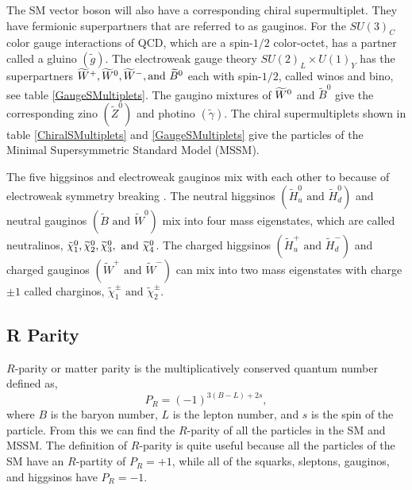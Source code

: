 The SM vector boson will also have a corresponding chiral supermultiplet. They have fermionic superpartners that are referred to as gauginos. For the $SU(3)_C$ color gauge interactions of QCD, which are a spin-$1/2$ color-octet, has a partner called a gluino $(\widetilde{g})$. The electroweak gauge theory $SU(2)_L\times U(1)_Y$ has the superpartners $\widetilde{W}^+,\widetilde{W}^0, \widetilde{W}^-, \text{and } \widetilde{B}^0$ each with spin-$1/2$, called winos and bino, see table \ref{GaugeSMultiplets}. The gaugino mixtures of $\widetilde{W}^0$ and $\widetilde{B}^0$ give the corresponding zino $(\widetilde{Z}^0)$ and photino $(\widetilde{\gamma})$. The chiral supermultiplets shown in table \ref{ChiralSMultiplets} and \ref{GaugeSMultiplets} give the particles of the Minimal Supersymmetric Standard Model (MSSM). 

The five higgsinos and electroweak gauginos mix with each other to because of electroweak symmetry breaking \cite{martin_supersymmetry_1997}. The neutral higgsinos $(\widetilde{H}_u^0 \text{ and } \widetilde{H}_d^0)$ and neutral gauginos $(\widetilde{B} \text{ and } \widetilde{W}^0)$ mix into four mass eigenstates, which are called neutralinos, $\tilde{\chi}^{0}_{1}, \widetilde{\chi}^0_2, \widetilde{\chi}^0_3, \text{ and }\widetilde{\chi}^0_4$. The charged higgsinos $(\widetilde{H}_u^+ \text{ and } \widetilde{H}_d^-)$ and charged gauginos $(\widetilde{W}^+\text{ and } \widetilde{W}^-)$ can mix into two mass eigenstates with charge $\pm1$ called charginos,  $\widetilde{\chi}^\pm_1 \text{ and } \widetilde{\chi}^\pm_2$. 

\subsection{R Parity}
\label{subsec:rparity}

$R$-parity or matter parity is the multiplicatively conserved quantum number defined as, 
\begin{equation} \label{RParity}
P_R=(-1)^{3(B-L)+2s}, 
\end{equation}
where $B$ is the baryon number, $L$ is the lepton number, and $s$ is the spin of the particle. From this we can find the $R$-parity of all the particles in the SM and MSSM. The definition of $R$-parity is quite useful because all the particles of the SM have an $R$-partity of $P_R=+1$, while all of the squarks, sleptons, gauginos, and higgsinos have $P_R=-1$.


